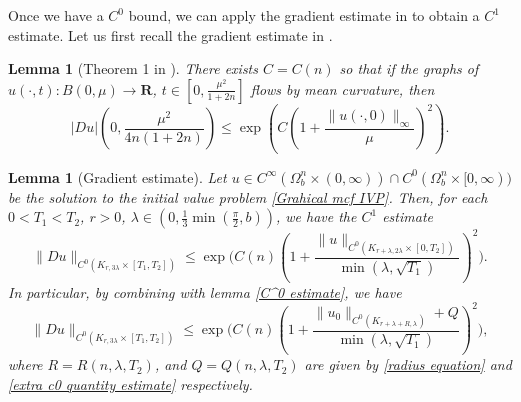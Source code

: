 \documentclass[pdflatex,sn-mathphys-num]{sn-jnl}%
\newtheorem{lemma}[theorem]{Lemma}
\begin{document}
Once we have a $C^0$ bound, we can apply the gradient estimate in \cite{gradientestimate} to obtain a $C^1$ estimate. Let us first recall the gradient estimate in \cite{gradientestimate}.
\begin{lemma}[Theorem 1 in \cite{gradientestimate}]\label{gradient estimate of colding minicozzi}
   There exists $C = C(n)$ so that if the graphs of $u(\cdot, t) : B(0, \mu)  \to \mathbf{R}$, $t \in  [0, \frac{\mu^2}{1 + 2n}]$ flows by mean curvature, then
   \begin{equation}
       |Du|(0, \frac{\mu^2}{4n(1 + 2n)}) \leq \exp(C(1 + \frac{\|u(\cdot, 0)\|_{\infty}}{\mu})^2).
   \end{equation}
\end{lemma}
\begin{lemma}[Gradient estimate]\label{gradient estimate}
  Let $u \in C^{\infty}(\Omega^n_b \times (0, \infty)) \cap C^0(\Omega^n_b \times [0, \infty))$ be the solution to the initial value problem \eqref{Grahical mcf IVP}. Then, for each $0 < T_1 < T_2$, $r > 0$, $\lambda \in (0,\frac{1}{3}\min(\frac{\pi}{2},b))$, we have the $C^1$ estimate   
  \begin{equation}\label{gradient estimate final}
    \|Du\|_{C^0(K_{r, 3\lambda} \times [T_1, T_2])} \leq \exp{(C(n)(1 + \frac{\|u\|_{C^0(K_{r + \lambda, 2\lambda}\times [0, T_2])}}{\min(\lambda, \sqrt{T_1})})^2}). 
  \end{equation}
  In particular, by combining with lemma \ref{C^0 estimate}, we have
   \begin{equation}\label{gradient estimate only initial data}
    \|Du\|_{C^0(K_{r, 3\lambda} \times [T_1, T_2])} \leq \exp{(C(n)(1 + \frac{\|u_0\|_{C^0(K_{r + \lambda + R, \lambda})} + Q}{\min(\lambda, \sqrt{T_1})})^2}),
  \end{equation}
  where $R = R(n,\lambda, T_2)$, and $Q = Q(n, \lambda, T_2)$ are given by \eqref{radius equation} and \eqref{extra c0 quantity estimate} respectively.
\end{lemma}
\end{document}
